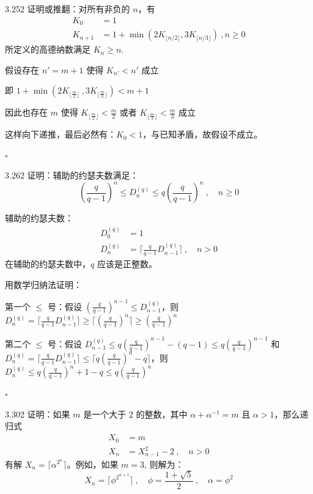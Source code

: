 \begin{problem}{3.25}{2}
  证明或推翻：对所有非负的 \( n \)，有
  \begin{align*}
    K_0 &= 1 \\
    K_{n+1} &= 1 + \min (2K_{\lfloor n/2 \rfloor},3K_{\lfloor n/3 \rfloor}) \ , n \ge 0
  \end{align*}
  所定义的高德纳数满足 \( K_n \ge n \).
\end{problem}

假设存在 \( n' = m+1 \) 使得 \( K_{n'} < n' \) 成立

即 \( 1 + \min (2K_{\lfloor \frac{m}{2} \rfloor} \ , 3K_{\lfloor \frac{m}{3} \rfloor}) < m + 1 \)

因此也存在 \( m \) 使得 \( K_{\lfloor \frac{m}{2} \rfloor} < \frac{m}{2} \) 或者 \( K_{\lfloor \frac{m}{3} \rfloor} < \frac{m}{3} \) 成立

这样向下递推，最后必然有：\( K_0 < 1 \)，与已知矛盾，故假设不成立。

\hfill \( \square \)

\begin{problem}{3.26}{2}
  证明：辅助的约瑟夫数满足：
  \[
    (\frac{q}{q-1})^n \le D_n^{(q)} \le q (\frac{q}{q-1})^n \ , \quad n \ge 0
  \]
\end{problem}

辅助的约瑟夫数：
\begin{align*}
  D_0^{(q)} &= 1 \\
  D_n^{(q)} &= \lceil \frac{q}{q-1} D_{n-1}^{(q)} \rceil \ , \quad n > 0
\end{align*}
在辅助的约瑟夫数中，\( q \) 应该是正整数。

用数学归纳法证明：

第一个 \( \le \) 号：假设 \( (\frac{q}{q-1})^{n-1} \le D_{n-1}^{(q)} \)，则 \( D_n^{(q)} = \lceil \frac{q}{q-1} D_{n-1}^{(q)} \rceil \ge \lceil (\frac{q}{q-1})^n \rceil \ge (\frac{q}{q-1})^n \)

第二个 \( \le \) 号：假设 \( D_{n-1}^{(q)} \le q (\frac{q}{q-1})^{n-1} - (q - 1) \le q (\frac{q}{q-1})^{n-1} \) 和 \( D_n^{(q)} = \lceil \frac{q}{q-1} D_{n-1}^{(q)} \rceil \le \lceil q (\frac{q}{q-1})^n - q \rceil \)，则 \( D_n^{(q)} \le q(\frac{q}{q-1})^n + 1 - q \le q (\frac{q}{q-1})^n \)

\hfill \( \square \)

\begin{problem}{3.30}{2}
  证明：如果 \( m \) 是一个大于 2 的整数，其中 \( \alpha + \alpha^{-1} = m \) 且 \( \alpha > 1 \)，那么递归式
  \begin{align*}
    X_0 &= m \\
    X_n &= X_{n-1}^2 - 2 \ , \quad n > 0
  \end{align*}
  有解 \( X_n = \lceil \alpha^{2^n} \rceil \)。例如，如果 \( m=3 \), 则解为：
  \[
    X_n = \lceil \phi^{2^{n+1}} \rceil \ , \quad \phi = \frac{1+\sqrt{5}}{2} \ , \quad \alpha = \phi^2
  \]
\end{problem}

